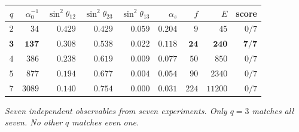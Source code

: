 \begin{center}
\begin{tabular}{@{}crrrrrrrr@{}}
\toprule
$q$ & $\alpha^{-1}_0$ & $\sin^2\theta_{12}$ & $\sin^2\theta_{23}$
& $\sin^2\theta_{13}$ & $\alpha_s$ & $f$ & $E$ & score \\
\midrule
$2$ & $34$ & $0.429$ & $0.429$ & $0.059$ & $0.204$ & $9$ & $45$ & $0/7$ \\
$\mathbf{3}$ & $\mathbf{137}$ & $\mathbf{0.308}$ & $\mathbf{0.538}$
& $\mathbf{0.022}$ & $\mathbf{0.118}$ & $\mathbf{24}$ & $\mathbf{240}$
& $\mathbf{7/7}$ \\
$4$ & $386$ & $0.238$ & $0.619$ & $0.009$ & $0.077$ & $50$ & $850$ & $0/7$ \\
$5$ & $877$ & $0.194$ & $0.677$ & $0.004$ & $0.054$ & $90$ & $2340$ & $0/7$ \\
$7$ & $3089$ & $0.140$ & $0.754$ & $0.000$ & $0.031$ & $224$ & $11200$ & $0/7$ \\
\bottomrule
\end{tabular}
\end{center}
\emph{Seven independent observables from seven experiments.
Only $q=3$ matches all seven. No other $q$ matches even one.}
